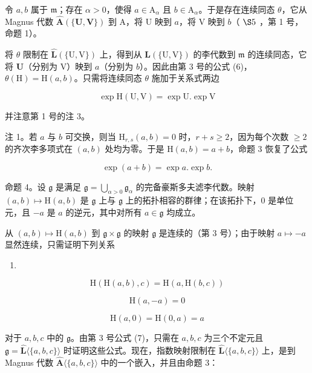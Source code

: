 令 \(a, b\) 属于 \(\mathfrak{m}\)；存在 \(\alpha > 0\)，使得 \(a \in \mathrm{A}_{\alpha}\) 且 \(b \in \mathrm{A}_{\alpha}\)。于是存在连续同态 \(\theta\)，它从 Magnus 代数 \(\hat{\mathbf{A}}(\{\mathbf{U},\mathbf{V}\})\) 到 A，将 U 映到 \(a\)，将 V 映到 \(b\)（ \(\S 5\) ，第 1 号，命题 1）。

将 \(\theta\) 限制在 \(\hat{\mathbf{L}}(\{\mathrm{U},\mathrm{V}\})\) 上，得到从 \(\mathbf{L}(\{\mathrm{U},\mathrm{V}\})\) 的李代数到 \(\mathfrak{m}\) 的连续同态，它将 \(\mathbf{U}\)（分别为 V）映到 \(a\)（分别为 \(b\)）。因此由第 3 号的公式 (6)，\(\theta (\mathrm{H}) = \mathrm{H}(a,b)\)。只需将连续同态 \(\theta\) 施加于关系式两边

\[
\exp \mathrm{H} (\mathrm{U}, \mathrm{V}) = \exp \mathrm{U}. \exp \mathrm{V}
\]

并注意第 1 号的注 3。

注 1。若 \(a\) 与 \(b\) 可交换，则当 \(\mathrm{H}_{r,s}(a,b) = 0\) 时，\(r + s \geqslant 2\)，因为每个次数 \(\geqslant 2\) 的齐次李多项式在 \((a,b)\) 处均为零。于是 \(\mathrm{H}(a,b) = a + b\)，命题 3 恢复了公式

\[
\exp (a + b) = \exp a. \exp b.
\]

命题 4。设 \(\mathfrak{g}\) 是满足 \(\mathfrak{g} = \bigcup_{\alpha >0} \mathfrak{g}_{\alpha}\) 的完备豪斯多夫滤李代数。映射 \((a, b) \mapsto \mathrm{H}(a, b)\) 是 \(\mathfrak{g}\) 上与 \(\mathfrak{g}\) 上的拓扑相容的群律；在该拓扑下，\(0\) 是单位元，且 \(-a\) 是 \(a\) 的逆元，其中对所有 \(a \in \mathfrak{g}\) 均成立。

从 \((a, b) \mapsto \mathrm{H}(a, b)\) 到 \(\mathfrak{g} \times \mathfrak{g}\) 的映射 \(\mathfrak{g}\) 是连续的（第 3 号）；由于映射 \(a \mapsto -a\) 显然连续，只需证明下列关系

\begin{enumerate}
\def\labelenumi{(\arabic{enumi})}
\setcounter{enumi}{17}
\tightlist
\item
\end{enumerate}

\[
\mathrm{H} (\mathrm{H} (a, b), c) = \mathrm{H} (a, \mathrm{H} (b, c))\tag{18}
\]

\[
\mathrm{H} (a, - a) = 0\tag{19}
\]

\[
\mathrm{H} (a, 0) = \mathrm{H} (0, a) = a\tag{20}
\]

对于 \(a, b, c\) 中的 \(\mathfrak{g}\)。由第 3 号公式 (7)，只需在 \(a, b, c\) 为三个不定元且 \(\mathfrak{g} = \hat{\mathbf{L}}\langle \{a, b, c\}\rangle\) 时证明这些公式。现在，指数映射限制在 \(\hat{\mathbf{L}}\langle \{a, b, c\}\rangle\) 上，是到 Magnus 代数 \(\hat{\mathbf{A}}\langle \{a, b, c\}\rangle\) 中的一个嵌入，并且由命题 3：

